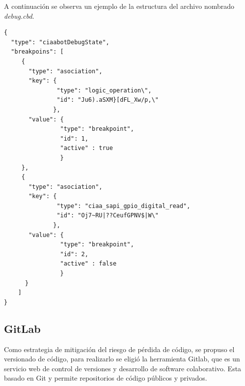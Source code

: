 A continuación se observa un ejemplo de la estructura del archivo nombrado \emph{debug.cbd}.


\begin{lstlisting}[caption=Archivo de descripción de \emph{board} nombrado \emph{fakeBoard.json}] 
{
  "type": "ciaabotDebugState",
  "breakpoins": [
     {
       "type": "asociation",
       "key": {
               "type": "logic_operation\",
               "id": "Ju6).aSXM}[dFL_Xw/p,\"
              },
       "value": {
                "type": "breakpoint",
                "id": 1,
                "active" : true
                }
     }, 
     {
       "type": "asociation",
       "key": {
               "type": "ciaa_sapi_gpio_digital_read",
               "id": "Oj7~RU|??CeufGPNV$|W\"
              },
       "value": {
                "type": "breakpoint",
                "id": 2,
                "active" : false
                }
      }
    ]
}
\end{lstlisting}


\subsection{GitLab}
\label{subsec:GitLab}

Como estrategia de mitigación del riesgo de pérdida de código, se propuso el versionado de código, para realizarlo se eligió la herramienta Gitlab, que es un servicio web de control de versiones y desarrollo de software colaborativo. Esta basado en Git y permite repositorios de código públicos y privados. 

